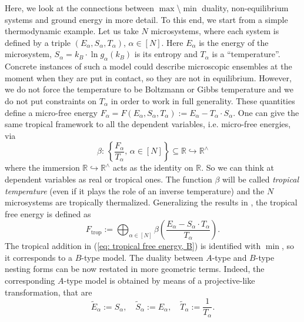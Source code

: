 \documentclass[11pt,british,reqno]{article}
\numberwithin{equation}{section}
\numberwithin{figure}{section}
\numberwithin{table}{section}
\theoremstyle{definition}
\theoremstyle{definition}
\theoremstyle{plain}
\theoremstyle{plain}
\theoremstyle{remark}
\theoremstyle{plain}
\numberwithin{equation}{section}
\numberwithin{figure}{section}
\numberwithin{table}{section}
\theoremstyle{plain}
\begin{document}
Here, we look at the connections between $\max$\textbackslash{}$\min$
duality, non-equilibrium systems and ground energy in more detail.
To this end, we start from a simple thermodynamic example. Let us
take $N$ microsystems, where each system is defined by a triple $(E_{\alpha},S_{\alpha},T_{\alpha})$,
$\alpha\in[N]$. Here $E_{\alpha}$ is the energy of the microsystem,
$S_{\alpha}=k_{B}\cdot\ln g_{\alpha}(k_{B})$ is its entropy and $T_{\alpha}$
is a ``temperature''. Concrete instances of such a model could describe microscopic ensembles at the moment when they are put in contact, so they are not in equilibrium. However, we do not force the temperature to be Boltzmann
or Gibbs temperature and we do not put constraints on $T_{\alpha}$ in order to work in full generality. 
These quantities define a micro-free energy $F_{\alpha}=F(E_{\alpha},S_{\alpha},T_{\alpha}):=E_{\alpha}-T_{\alpha}\cdot S_{\alpha}$.
One can give the same tropical framework to all the dependent
variables, i.e. micro-free energies, via 
\begin{equation}
\beta:\,\left\{ \frac{F_{\alpha}}{T_{\alpha}},\,\alpha\in[N]\right\} \subseteq\mathbb{R}\hookrightarrow\mathbb{R}^{\wedge}\label{eq: tropicalization micro-free energies}
\end{equation}
where the immersion $\mathbb{R}\hookrightarrow\mathbb{R}^{\wedge}$
acts as the identity on $\mathbb{R}$. So we can think at dependent
variables as real or tropical ones. The function $\beta$ will be
called \emph{tropical temperature} (even if it plays the role of an inverse temperature)  and the $N$ microsystems are
tropically thermalized. Generalizing the results in \cite{AK2015},
the tropical free energy is defined as 
\begin{equation}
F_{\mathrm{trop}}:=\bigoplus_{\alpha\in[N]}\beta\left(\frac{E_{\alpha}-S_{\alpha}\cdot T_{\alpha}}{T_{\alpha}}\right).\label{eq: tropical free energy, B}
\end{equation}
The tropical addition in (\ref{eq: tropical free energy, B}) is identified
with $\min$, so it corresponds to a $B$-type model. The duality
between $A$-type and $B$-type nesting forms can be now restated
in more geometric terms. Indeed, the corresponding $A$-type model
is obtained by means of a projective-like transformation, that are
\begin{equation}
\tilde{E}_{\alpha}:=S_{\alpha},\quad\tilde{S}_{\alpha}:=E_{\alpha},\quad\tilde{T}_{\alpha}:=\frac{1}{T_{\alpha}}.\label{eq: real projective A/B transformation}
\end{equation}
\end{document}
